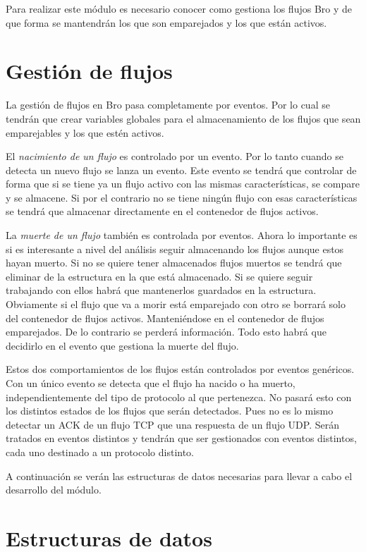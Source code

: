 \intro Para realizar este módulo es necesario conocer como gestiona los flujos Bro y de que forma se mantendrán 
los que son emparejados y los que están activos.

\section{Gestión de flujos}

La gestión de flujos en Bro pasa completamente por eventos. Por lo cual se tendrán que crear variables globales 
para el almacenamiento de los flujos que sean emparejables y los que estén activos.

\intro El \textit{nacimiento de un flujo} es controlado por un evento. Por lo tanto cuando se detecta un nuevo 
flujo se lanza un evento. Este evento se tendrá que controlar de forma que si se tiene ya un flujo activo con las 
mismas características, se compare y se almacene. Si por el contrario no se tiene ningún flujo con esas 
características se tendrá que almacenar directamente en el contenedor de flujos activos.

\intro La \textit{muerte de un flujo} también es controlada por eventos. Ahora lo importante es si es interesante 
a nivel del análisis seguir almacenando los flujos aunque estos hayan muerto. Si no se quiere tener almacenados 
flujos muertos se tendrá que eliminar de la estructura en la que está almacenado. Si se quiere seguir trabajando 
con ellos habrá que mantenerlos guardados en la estructura. Obviamente si el flujo que va a morir está emparejado 
con otro se borrará solo del contenedor de flujos activos. Manteniéndose en el contenedor de flujos emparejados. De 
lo contrario se perderá información. Todo esto habrá que decidirlo en el evento que gestiona la muerte del flujo.

\intro Estos dos comportamientos de los flujos están controlados por eventos genéricos. Con un único evento se 
detecta que el flujo ha nacido o ha muerto, independientemente del tipo de protocolo al que pertenezca. No pasará 
esto con los distintos estados de los flujos que serán detectados. Pues no es lo mismo detectar un ACK de un flujo 
TCP que una respuesta de un flujo UDP. Serán tratados en eventos distintos y tendrán que ser gestionados con 
eventos distintos, cada uno destinado a un protocolo distinto. 

\intro A continuación se verán las estructuras de datos necesarias para llevar a cabo el desarrollo del módulo.

\section{Estructuras de datos}

